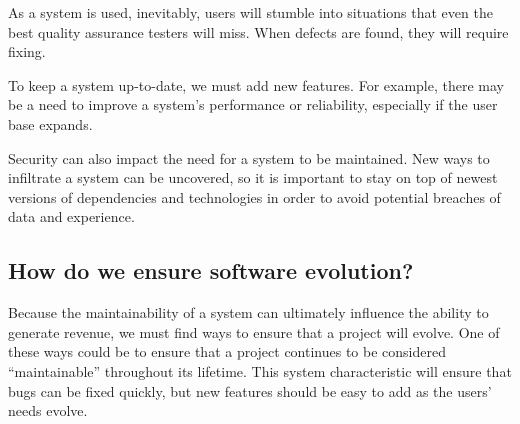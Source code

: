 As a system is used, inevitably, users will stumble into situations that even the best quality assurance testers will miss. When defects are found, they will require fixing. 

To keep a system up-to-date, we must add new features. For example, there may be a need to improve a system's performance or reliability, especially if the user base expands.

Security can also impact the need for a system to be maintained. New ways to infiltrate a system can be uncovered, so it is important to stay on top of newest versions of dependencies and technologies in order to avoid potential breaches of data and experience.

\subsection{How do we ensure software evolution?} \label{subEnsureEvolution}

Because the maintainability of a system can ultimately influence the ability to generate revenue, we must find ways to ensure that a project will evolve. One of these ways could be to ensure that a project continues to be considered ``maintainable'' throughout its lifetime. This system characteristic will ensure that bugs can be fixed quickly, but new features should be easy to add as the users' needs evolve.
